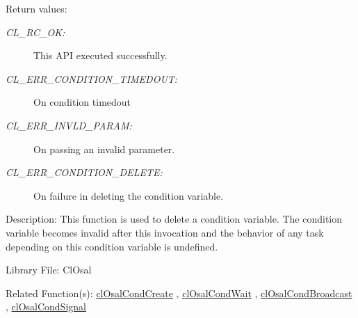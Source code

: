 \begin{Desc}
\item[Return values:]
\begin{description}
\item[{\em CL\_\-RC\_\-OK:}]This API executed successfully. \item[{\em CL\_\-ERR\_\-CONDITION\_\-TIMEDOUT:}]On condition timedout \item[{\em CL\_\-ERR\_\-INVLD\_\-PARAM:}]On passing an invalid parameter. \item[{\em CL\_\-ERR\_\-CONDITION\_\-DELETE:}]On failure in deleting the condition variable.\end{description}
\end{Desc}
\begin{Desc}
\item[Description:]This function is used to delete a condition variable. The condition variable becomes invalid after this invocation and the behavior of any task depending on this condition variable is undefined.\end{Desc}
\begin{Desc}
\item[Library File:]Cl\-Osal\end{Desc}
\begin{Desc}
\item[Related Function(s):]\hyperlink{pageosal118}{cl\-Osal\-Cond\-Create} , \hyperlink{pageosal120}{cl\-Osal\-Cond\-Wait} , 
\hyperlink{pageosal121}{cl\-Osal\-Cond\-Broadcast} , \hyperlink{pageosal122}{cl\-Osal\-Cond\-Signal} \end{Desc}

\newpage
